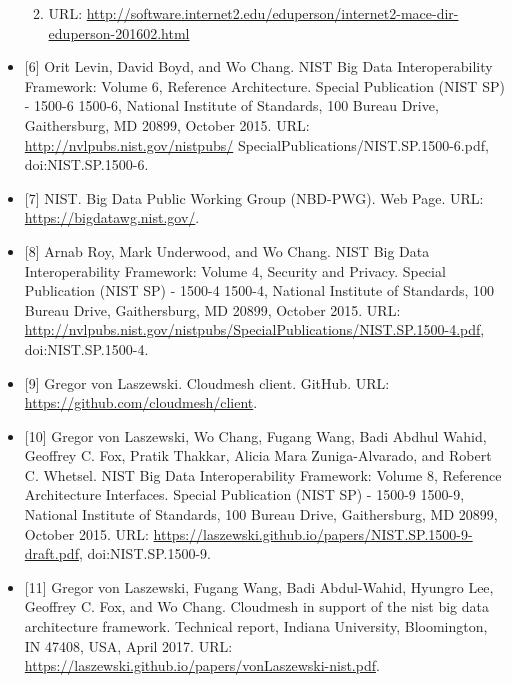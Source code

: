 \documentclass[9pt,]{article}
\providecommand{\tightlist}{%
  \setlength{\itemsep}{0pt}\setlength{\parskip}{0pt}}
\begin{document}
\begin{itemize}
  \begin{enumerate}
  \def\labelenumi{\arabic{enumi}.}
  \setcounter{enumi}{2015}
  \tightlist
  \item
    URL:
    \url{http://software.internet2.edu/eduperson/internet2-mace-dir-eduperson-201602.html}
  \end{enumerate}
\item
  {[}6{]} Orit Levin, David Boyd, and Wo Chang. NIST Big Data
  Interoperability Framework: Volume 6, Reference Architecture. Special
  Publication (NIST SP) - 1500-6 1500-6, National Institute of
  Standards, 100 Bureau Drive, Gaithersburg, MD 20899, October 2015.
  URL: \url{http://nvlpubs.nist.gov/nistpubs/}
  SpecialPublications/NIST.SP.1500-6.pdf, doi:NIST.SP.1500-6.
\item
  {[}7{]} NIST. Big Data Public Working Group (NBD-PWG). Web Page. URL:
  \url{https://bigdatawg.nist.gov/}.
\item
  {[}8{]} Arnab Roy, Mark Underwood, and Wo Chang. NIST Big Data
  Interoperability Framework: Volume 4, Security and Privacy. Special
  Publication (NIST SP) - 1500-4 1500-4, National Institute of
  Standards, 100 Bureau Drive, Gaithersburg, MD 20899, October 2015.
  URL:
  \url{http://nvlpubs.nist.gov/nistpubs/SpecialPublications/NIST.SP.1500-4.pdf},
  doi:NIST.SP.1500-4.
\item
  {[}9{]} Gregor von Laszewski. Cloudmesh client. GitHub. URL:
  \url{https://github.com/cloudmesh/client}.
\item
  {[}10{]} Gregor von Laszewski, Wo Chang, Fugang Wang, Badi Abdhul
  Wahid, Geoffrey C. Fox, Pratik Thakkar, Alicia Mara Zuniga-Alvarado,
  and Robert C. Whetsel. NIST Big Data Interoperability Framework:
  Volume 8, Reference Architecture Interfaces. Special Publication (NIST
  SP) - 1500-9 1500-9, National Institute of Standards, 100 Bureau
  Drive, Gaithersburg, MD 20899, October 2015. URL:
  \url{https://laszewski.github.io/papers/NIST.SP.1500-9-draft.pdf},
  doi:NIST.SP.1500-9.
\item
  {[}11{]} Gregor von Laszewski, Fugang Wang, Badi Abdul-Wahid, Hyungro
  Lee, Geoffrey C. Fox, and Wo Chang. Cloudmesh in support of the nist
  big data architecture framework. Technical report, Indiana University,
  Bloomington, IN 47408, USA, April 2017. URL:
  \url{https://laszewski.github.io/papers/vonLaszewski-nist.pdf}.
\end{itemize}
\end{document}
